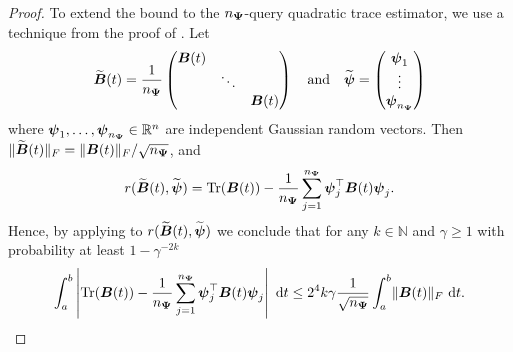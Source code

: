 \documentclass[12pt]{article}
\begin{document}
\begin{proof}
    To extend the bound to the $n_{\boldsymbol{\Psi}}$-query quadratic trace estimator, we use a technique from the proof of \cite[theorem 1]{cortinovis-2022-randomized-trace}. Let
    \begin{equation}
        \widetilde{\boldsymbol{B}}(t)
        = \frac{1}{n_{\boldsymbol{\Psi}}} \begin{pmatrix}
            \boldsymbol{B}(t) & & \\
            & \ddots & \\
            & & \boldsymbol{B}(t)
        \end{pmatrix}
        \quad \text{and} \quad
        \widetilde{\boldsymbol{\psi}} = \begin{pmatrix}
            \boldsymbol{\psi}_1 \\
            \vdots \\
            \boldsymbol{\psi}_{n_{\boldsymbol{\Psi}}}
        \end{pmatrix}
    \end{equation}
    where $\boldsymbol{\psi}_1, \dots, \boldsymbol{\psi}_{n_{\boldsymbol{\Psi}}} \in \mathbb{R}^{n}$ are independent Gaussian random vectors. Then $\lVert \widetilde{\boldsymbol{B}}(t) \rVert _F = \lVert \boldsymbol{B}(t) \rVert _F / \sqrt{n_{\boldsymbol{\Psi}}}$, and
    \begin{equation}
        r(\widetilde{\boldsymbol{B}}(t), \widetilde{\boldsymbol{\psi}}) = \operatorname{Tr}(\boldsymbol{B}(t)) - \frac{1}{n_{\boldsymbol{\Psi}}} \sum_{j=1}^{n_{\boldsymbol{\Psi}}} \boldsymbol{\psi}_j^{\top} \boldsymbol{B}(t) \boldsymbol{\psi}_j.
    \end{equation}
    Hence, by applying  to $r(\widetilde{\boldsymbol{B}}(t), \widetilde{\boldsymbol{\psi}})$ we conclude that for any $k \in \mathbb{N}$ and $\gamma \geq 1$ with probability at least $1 - \gamma^{-2 k}$
    \begin{equation}
        \int_{a}^{b} \left| \operatorname{Tr}(\boldsymbol{B}(t)) - \frac{1}{n_{\boldsymbol{\Psi}}} \sum_{j=1}^{n_{\boldsymbol{\Psi}}} \boldsymbol{\psi}_j^{\top} \boldsymbol{B}(t) \boldsymbol{\psi}_j \right| ~ \mathrm{d}t
        \leq 2^4 k \gamma \frac{1}{\sqrt{n_{\boldsymbol{\Psi}}}} \int_{a}^{b} \lVert \boldsymbol{B}(t) \rVert _F~\mathrm{d}t.
    \end{equation}



\end{proof}
\end{document}
